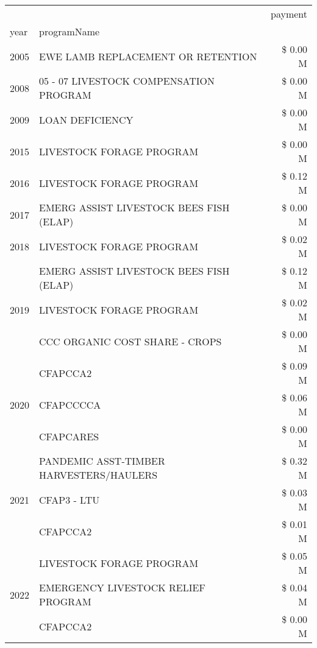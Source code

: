 \begin{tabular}{llr}
\toprule
 &  & payment \\
year & programName &  \\
\midrule
2005 & EWE LAMB REPLACEMENT OR RETENTION & \$ 0.00 M \\
\cline{1-3}
2008 & 05 - 07 LIVESTOCK COMPENSATION PROGRAM & \$ 0.00 M \\
\cline{1-3}
2009 & LOAN DEFICIENCY & \$ 0.00 M \\
\cline{1-3}
2015 & LIVESTOCK FORAGE PROGRAM & \$ 0.00 M \\
\cline{1-3}
2016 & LIVESTOCK FORAGE PROGRAM & \$ 0.12 M \\
\cline{1-3}
2017 & EMERG ASSIST LIVESTOCK BEES FISH (ELAP) & \$ 0.00 M \\
\cline{1-3}
2018 & LIVESTOCK FORAGE PROGRAM & \$ 0.02 M \\
\cline{1-3}
\multirow[t]{3}{*}{2019} & EMERG ASSIST LIVESTOCK BEES FISH (ELAP) & \$ 0.12 M \\
 & LIVESTOCK FORAGE PROGRAM & \$ 0.02 M \\
 & CCC ORGANIC COST SHARE - CROPS & \$ 0.00 M \\
\cline{1-3}
\multirow[t]{3}{*}{2020} & CFAPCCA2 & \$ 0.09 M \\
 & CFAPCCCCA & \$ 0.06 M \\
 & CFAPCARES & \$ 0.00 M \\
\cline{1-3}
\multirow[t]{3}{*}{2021} & PANDEMIC ASST-TIMBER HARVESTERS/HAULERS & \$ 0.32 M \\
 & CFAP3 - LTU & \$ 0.03 M \\
 & CFAPCCA2 & \$ 0.01 M \\
\cline{1-3}
\multirow[t]{3}{*}{2022} & LIVESTOCK FORAGE PROGRAM & \$ 0.05 M \\
 & EMERGENCY LIVESTOCK RELIEF PROGRAM & \$ 0.04 M \\
 & CFAPCCA2 & \$ 0.00 M \\
\cline{1-3}
\bottomrule
\end{tabular}
